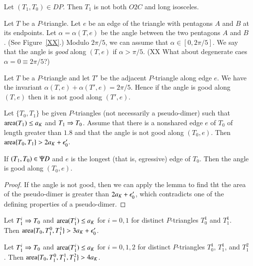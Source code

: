 \begin{lemma}\label{KUGAKIK}\label{calc:dimer-isosc}
Let $(T_1,T_0)\in DP$.  Then $T_1$ is not both $O2C$  and long isosceles.
\end{lemma}

\begin{definition}  Let $T$ be a $P$-triangle.  Let $e$ be an edge of the triangle with pentagons
$A$ and $B$ at its endpoints.
Let $\alpha = \alpha(T,e)$ be the angle between the two pentagons $A$ and $B$.  (See Figure~\ref{XX}.)  Modulo
$2\pi/5$, we can assume that $\alpha\in  [0,2\pi/5]$.  We say that the angle is {\it good} along $(T,e)$ if $\alpha>\pi/5$.
(XX What about degenerate caes $\alpha = 0 \equiv 2\pi/5$?)
\end{definition}

Let $T$ be a $P$-triangle and let $T'$ be the adjacent $P$-triangle along edge $e$.  
We have the invariant $\alpha(T,e)+\alpha(T',e)=2\pi/5$.
Hence if the angle is good along $(T,e)$ then it is not good along $(T',e)$.


\begin{lemma}\label{FHBGHHY}\label{calc:good}
Let $\{T_0,T_1\}$ be given $P$-triangles (not necessarily a pseudo-dimer) such that ${\operatorname{area}}(T_1)\le a_K$ and $T_1\Rightarrow T_0$.
Assume that there is a nonshared edge $e$ of $T_0$ of length greater than $1.8$ and that the angle is not good along $(T_0,e)$.
Then ${\operatorname{area}}\{T_0,T_1\} > 2a_K + \epsilon_0'$.
\end{lemma}

\begin{corollary} If $(T_1,T_0)\in \Psi D$ and $e$ is the longest (that is, egressive) edge of $T_0$.  Then the angle
is good along $(T_0,e)$.
\end{corollary}

\begin{proof} If the angle is not good, then we can apply the lemma to find tht the area of the pseudo-dimer is
greater than $2a_K + \epsilon_0'$, which contradicts one of the defining properties of a pseudo-dimer.
\end{proof}


\begin{lemma}\label{HUQEJAT}\label{calc:pent3}
Let $T_1^i\Rightarrow T_0$ and ${\operatorname{area}}(T_1^i)\le a_K$ for $i=0,1$ for distinct $P$-triangles $T^1_0$ and $T^1_1$.
Then ${\operatorname{area}}\{T_0,T^0_1,T^1_1\} > 3a_K + \epsilon_0'$.
\end{lemma}

\begin{lemma}\label{QPJDYDB}\label{calc:pent4}
Let $T_1^i\Rightarrow T_0$ and ${\operatorname{area}}(T_1^i)\le a_K$ for $i=0,1,2$ for distinct $P$-triangles $T^1_0$, $T^1_1$, and $T^2_1$.
Then ${\operatorname{area}}\{T_0,T^0_1,T^1_1,T^2_1\} > 4a_K$.
\end{lemma}

